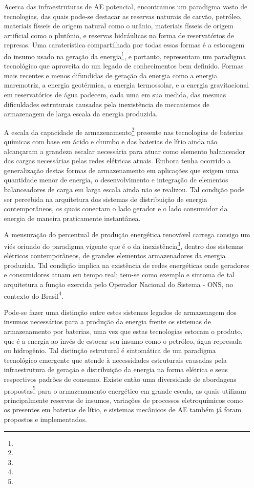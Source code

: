 \documentclass[
  12pt,       %
  openright,      %
  twoside,      %
  a4paper,      %
  english,      %
  french,       %
  spanish,      %
  brazil        %
  ]{abntex2}
\begin{document}
Acerca das infraestruturas de AE potencial, encontramos um paradigma vasto de tecnologias, das quais pode-se destacar as reservas naturais de carvão, petróleo, materiais físseis de origem natural como o urânio, materiais físseis de origem artificial como o plutônio, e reservas hidráulicas na forma de reservatórios de represas. Uma caraterística compartilhada por todas essas formas é a estocagem do insumo usado na geração da energia\footnote{}, e portanto, representam um paradigma tecnológico que aproveita do um legado de conhecimentos bem definido. Formas mais recentes e menos difundidas de geração da energia como a energia maremotriz, a energia geotérmica, a energia termossolar, e a energia gravitacional em reservatórios de água padecem, cada uma em sua medida, das mesmas dificuldades estruturais causadas pela inexistência de mecanismos de armazenagem de larga escala da energia produzida.

A escala da capacidade de armazenamento\footnote{} presente nas tecnologias de baterias químicas com base em ácido e chumbo e das baterias de lítio ainda não alcançaram a grandeza escalar necessária para atuar como elemento balanceador das cargas necessárias pelas redes elétricas atuais. Embora tenha ocorrido a generalização destas formas de armazenamento em aplicações que exigem uma quantidade menor de energia, o desenvolvimento e integração de elementos balanceadores de carga em larga escala ainda não se realizou. Tal condição pode ser percebida na arquitetura dos sistemas de distribuição de energia contemporâneos, os quais conectam o lado gerador e o lado consumidor da energia de maneira praticamente instantânea.

A mensuração do percentual de produção energética renovável carrega consigo um viés oriundo do paradigma vigente que é o da inexistência\footnote{}, dentro dos sistemas elétricos contemporâneos, de grandes elementos armazenadores da energia produzida. Tal condição implica na existência de redes energéticas onde geradores e consumidores atuam em tempo real; tem-se como exemplo e sintoma de tal arquitetura a função exercida pelo Operador Nacional do Sistema - ONS, no contexto do Brasil\footnote{}.

Pode-se fazer uma distinção entre estes sistemas legados de armazenagem dos insumos necessários para a produção da energia frente os sistemas de armazenamento por baterias, uma vez que estas tecnologias estocam o produto, que é a energia ao invés de estocar seu insumo como o petróleo, água represada ou hidrogênio. Tal distinção estrutural é sintomática de um paradigma tecnológico emergente que atende à necessidades estruturais causadas pela infraestrutura de geração e distribuição da energia na forma elétrica e seus respectivos padrões de consumo. Existe então uma diversidade de abordagens propostas\footnote{} para o armazenamento energético em grande escala, as quais utilizam principalmente reservas de insumos, variações de processos eletroquímicos como os presentes em baterias de lítio, e sistemas mecânicos de AE também já foram propostos e implementados.
\end{document}
